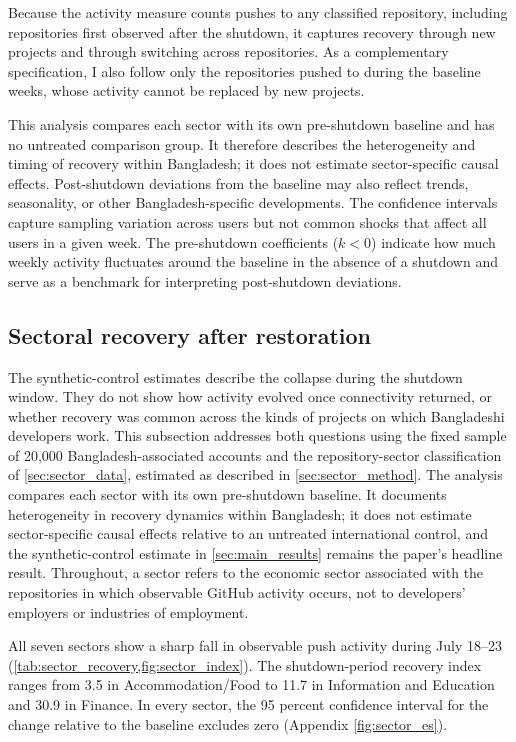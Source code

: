 Because the activity measure counts pushes to any classified repository, including repositories first observed after the shutdown, it captures recovery through new projects and through switching across repositories. As a complementary specification, I also follow only the repositories pushed to during the baseline weeks, whose activity cannot be replaced by new projects.

This analysis compares each sector with its own pre-shutdown baseline and has no untreated comparison group. It therefore describes the heterogeneity and timing of recovery within Bangladesh; it does not estimate sector-specific causal effects. Post-shutdown deviations from the baseline may also reflect trends, seasonality, or other Bangladesh-specific developments. The confidence intervals capture sampling variation across users but not common shocks that affect all users in a given week. The pre-shutdown coefficients ($k<0$) indicate how much weekly activity fluctuates around the baseline in the absence of a shutdown and serve as a benchmark for interpreting post-shutdown deviations.

\subsection{Sectoral recovery after restoration}
\label{sec:sector_results}

The synthetic-control estimates describe the collapse during the shutdown window. They do not show how activity evolved once connectivity returned, or whether recovery was common across the kinds of projects on which Bangladeshi developers work. This subsection addresses both questions using the fixed sample of 20,000 Bangladesh-associated accounts and the repository-sector classification of \cref{sec:sector_data}, estimated as described in \cref{sec:sector_method}. The analysis compares each sector with its own pre-shutdown baseline. It documents heterogeneity in recovery dynamics within Bangladesh; it does not estimate sector-specific causal effects relative to an untreated international control, and the synthetic-control estimate in \cref{sec:main_results} remains the paper's headline result. Throughout, a sector refers to the economic sector associated with the repositories in which observable GitHub activity occurs, not to developers' employers or industries of employment.



All seven sectors show a sharp fall in observable push activity during July 18--23 (\cref{tab:sector_recovery,fig:sector_index}). The shutdown-period recovery index ranges from 3.5 in Accommodation/Food to 11.7 in Information and Education and 30.9 in Finance. In every sector, the 95 percent confidence interval for the change relative to the baseline excludes zero (Appendix \cref{fig:sector_es}).


